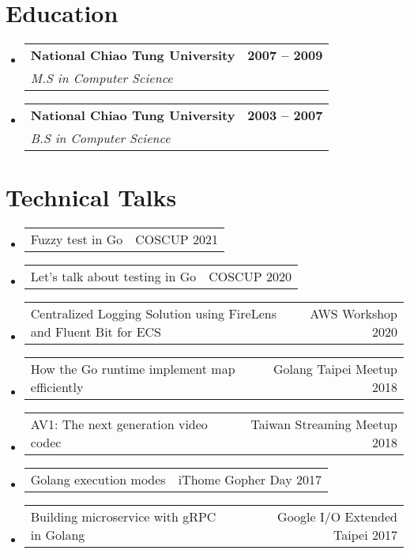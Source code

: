 \documentclass[letterpaper,11pt]{article}
\makeatletter
\newcommand{\resumeSubSubheading}[2]{
    \item
    \begin{tabular*}{1.0\textwidth}{l@{\extracolsep{\fill}}r}
      {#1} & \small{#2} \\
    \end{tabular*}\vspace{-7pt}
}
\newcommand{\resumeSubSubSubheading}[3]{
  \vspace{-2pt}\item
    \begin{tabular*}{1.0\textwidth}[t]{l@{\extracolsep{\fill}}r}
      \textbf{#1} & \textbf{\small #2} \\
      \textit{\small#3}  \\
    \end{tabular*}\vspace{-7pt}
}
\newcommand{\resumeSubHeadingListStart}{\begin{itemize}[leftmargin=0.0in, label={}]}
\newcommand{\resumeSubHeadingListEnd}{\end{itemize}}
\makeatother
\begin{document}
\vspace{-15pt}

\section{Education}
  \resumeSubHeadingListStart
    \resumeSubSubSubheading
      {National Chiao Tung University}{2007 -- 2009}
      {M.S in Computer Science}
    \resumeSubSubSubheading
      {National Chiao Tung University}{2003 -- 2007}
      {B.S in Computer Science}
  \resumeSubHeadingListEnd

\section{Technical Talks}
    \resumeSubHeadingListStart
        \resumeSubSubheading{Fuzzy test in Go}{COSCUP 2021}
        \resumeSubSubheading{Let’s talk about testing in Go}{COSCUP 2020}
        \resumeSubSubheading{Centralized Logging Solution using FireLens and Fluent Bit for ECS}{AWS Workshop 2020}
        \resumeSubSubheading{How the Go runtime implement map efficiently}{Golang Taipei Meetup 2018}
        \resumeSubSubheading{AV1: The next generation video codec}{Taiwan Streaming Meetup 2018}
        \resumeSubSubheading{Golang execution modes}{iThome Gopher Day 2017}
        \resumeSubSubheading{Building microservice with gRPC in Golang}{Google I/O Extended Taipei 2017}
    \resumeSubHeadingListEnd

\end{document}
